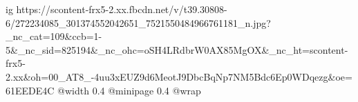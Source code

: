  
 
 
 
 

\ifcmt
  ig https://scontent-frx5-2.xx.fbcdn.net/v/t39.30808-6/272234085_301374552042651_7521550484966761181_n.jpg?_nc_cat=109&ccb=1-5&_nc_sid=825194&_nc_ohc=oSH4LRdbrW0AX85MgOX&_nc_ht=scontent-frx5-2.xx&oh=00_AT8_-4uu3xEUZ9d6MeotJ9DbcBqNp7NM5Bdc6Ep0WDqezg&oe=61EEDE4C
  @width 0.4
  @minipage 0.4
  @wrap \parpic[r]
\fi
